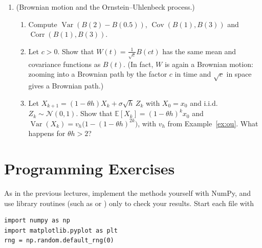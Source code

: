 \documentclass[11pt]{article}
\newcommand{\py}[1]{\texttt{\detokenize{#1}}}
\newcommand{\E}{\mathbb{E}}
\DeclareMathOperator{\Var}{Var}
\DeclareMathOperator{\Cov}{Cov}
\DeclareMathOperator{\Corr}{Corr}
\theoremstyle{definition}
\theoremstyle{plain}
\theoremstyle{remark}
\begin{document}
\begin{enumerate}[leftmargin=*]
\begin{enumerate}[label=(\alph*)]
        \item Show that the posterior covariance $\sigma^2M^{-1}$ of $\mathbf{z}$ is $\sigma^2I_k$ minus a positive semidefinite matrix, so that observing $\mathbf{x}$ reduces the uncertainty about $\mathbf{z}$ in every direction.
    \end{enumerate}
    \item (Brownian motion and the Ornstein--Uhlenbeck process.)
    \begin{enumerate}[label=(\alph*)]
        \item Compute $\Var(B(2) - B(0.5))$, $\Cov(B(1), B(3))$ and $\Corr(B(1), B(3))$.
        \item Let $c > 0$. Show that $W(t) = \frac{1}{\sqrt{c}}B(ct)$ has the same mean and covariance functions as $B(t)$. (In fact, $W$ is again a Brownian motion: zooming into a Brownian path by the factor $c$ in time and $\sqrt{c}$ in space gives a Brownian path.)
        \item Let $X_{k+1} = (1 - \theta h)X_k + \sigma\sqrt{h}\,Z_k$ with $X_0 = x_0$ and i.i.d.\ $Z_k \sim \mathcal{N}(0, 1)$. Show that $\E[X_k] = (1 - \theta h)^kx_0$ and $\Var(X_k) = v_h\big(1 - (1 - \theta h)^{2k}\big)$, with $v_h$ from Example~\ref{ex:ou}. What happens for $\theta h > 2$?
    \end{enumerate}
\end{enumerate}

\section{Programming Exercises}\label{sec:programming}

\setlength{\emergencystretch}{3em}

As in the previous lectures, implement the methods yourself with NumPy, and use library routines (such as \py{rng.normal} or \py{scipy.stats}) only to check your results. Start each file with
\begin{lstlisting}
import numpy as np
import matplotlib.pyplot as plt
rng = np.random.default_rng(0)
\end{lstlisting}
\end{document}
